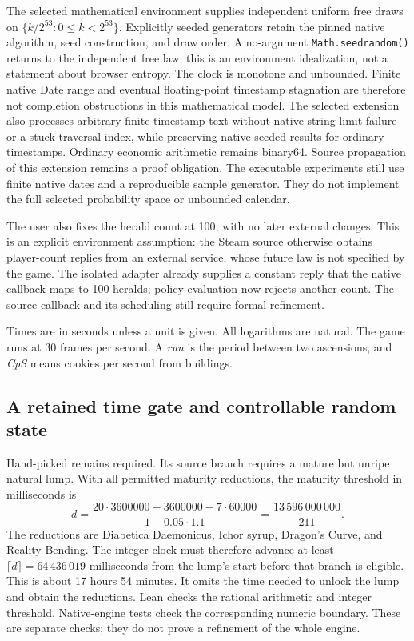 \documentclass[11pt,a4paper]{article}
\numberwithin{equation}{section}
\theoremstyle{definition}
\theoremstyle{remark}
\begin{document}
The selected mathematical environment supplies independent uniform free draws on $\{k/2^{53}:0\leq k<2^{53}\}$. Explicitly seeded generators retain the pinned native algorithm, seed construction, and draw order. A no-argument \texttt{Math.seedrandom()} returns to the independent free law; this is an environment idealization, not a statement about browser entropy. The clock is monotone and unbounded. Finite native Date range and eventual floating-point timestamp stagnation are therefore not completion obstructions in this mathematical model. The selected extension also processes arbitrary finite timestamp text without native string-limit failure or a stuck traversal index, while preserving native seeded results for ordinary timestamps. Ordinary economic arithmetic remains binary64. Source propagation of this extension remains a proof obligation. The executable experiments still use finite native dates and a reproducible sample generator. They do not implement the full selected probability space or unbounded calendar.

The user also fixes the herald count at 100, with no later external changes. This is an explicit environment assumption: the Steam source otherwise obtains player-count replies from an external service, whose future law is not specified by the game. The isolated adapter already supplies a constant reply that the native callback maps to 100 heralds; policy evaluation now rejects another count. The source callback and its scheduling still require formal refinement.

Times are in seconds unless a unit is given. All logarithms are natural. The game runs at 30 frames per second. A \emph{run} is the period between two ascensions, and \emph{CpS} means cookies per second from buildings.

\subsection{A retained time gate and controllable random state}\label{sec:source-randomness}
Hand-picked remains required. Its source branch requires a mature but unripe natural lump. With all permitted maturity reductions, the maturity threshold in milliseconds is
\[
 d=\frac{20\cdot3600000-3600000-7\cdot60000}{1+0.05\cdot1.1}
   =\frac{13\,596\,000\,000}{211}.
\]
The reductions are Diabetica Daemonicus, Ichor syrup, Dragon's Curve, and Reality Bending. The integer clock must therefore advance at least $\lceil d\rceil=64\,436\,019$ milliseconds from the lump's start before that branch is eligible. This is about 17 hours 54 minutes. It omits the time needed to unlock the lump and obtain the reductions. Lean checks the rational arithmetic and integer threshold. Native-engine tests check the corresponding numeric boundary. These are separate checks; they do not prove a refinement of the whole engine.
\end{document}
